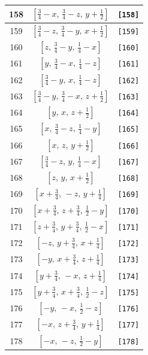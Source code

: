 \documentclass[fleqn,8pt]{jsarticle}
\begin{document}
\begin{longtable}{ccc}
158 & $\left[ \frac{3}{4} - x,\, \frac{3}{4} - z,\, y + \frac{1}{2} \right]$ & {\tt [158]} \\ \hline
159 & $\left[ \frac{3}{4} - z,\, \frac{3}{4} - y,\, x + \frac{1}{2} \right]$ & {\tt [159]} \\ \hline
160 & $\left[ z,\, \frac{3}{4} - y,\, \frac{1}{4} - x \right]$ & {\tt [160]} \\ \hline
161 & $\left[ y,\, \frac{3}{4} - x,\, \frac{1}{4} - z \right]$ & {\tt [161]} \\ \hline
162 & $\left[ \frac{3}{4} - y,\, x,\, \frac{1}{4} - z \right]$ & {\tt [162]} \\ \hline
163 & $\left[ \frac{3}{4} - y,\, \frac{3}{4} - x,\, z + \frac{1}{2} \right]$ & {\tt [163]} \\ \hline
164 & $\left[ y,\, x,\, z + \frac{1}{2} \right]$ & {\tt [164]} \\ \hline
165 & $\left[ x,\, \frac{3}{4} - z,\, \frac{1}{4} - y \right]$ & {\tt [165]} \\ \hline
166 & $\left[ x,\, z,\, y + \frac{1}{2} \right]$ & {\tt [166]} \\ \hline
167 & $\left[ \frac{3}{4} - z,\, y,\, \frac{1}{4} - x \right]$ & {\tt [167]} \\ \hline
168 & $\left[ z,\, y,\, x + \frac{1}{2} \right]$ & {\tt [168]} \\ \hline
169 & $\left[ x + \frac{3}{4},\, - z,\, y + \frac{1}{4} \right]$ & {\tt [169]} \\ \hline
170 & $\left[ x + \frac{3}{4},\, z + \frac{3}{4},\, \frac{1}{2} - y \right]$ & {\tt [170]} \\ \hline
171 & $\left[ z + \frac{3}{4},\, y + \frac{3}{4},\, \frac{1}{2} - x \right]$ & {\tt [171]} \\ \hline
172 & $\left[ - z,\, y + \frac{3}{4},\, x + \frac{1}{4} \right]$ & {\tt [172]} \\ \hline
173 & $\left[ - y,\, x + \frac{3}{4},\, z + \frac{1}{4} \right]$ & {\tt [173]} \\ \hline
174 & $\left[ y + \frac{3}{4},\, - x,\, z + \frac{1}{4} \right]$ & {\tt [174]} \\ \hline
175 & $\left[ y + \frac{3}{4},\, x + \frac{3}{4},\, \frac{1}{2} - z \right]$ & {\tt [175]} \\ \hline
176 & $\left[ - y,\, - x,\, \frac{1}{2} - z \right]$ & {\tt [176]} \\ \hline
177 & $\left[ - x,\, z + \frac{3}{4},\, y + \frac{1}{4} \right]$ & {\tt [177]} \\ \hline
178 & $\left[ - x,\, - z,\, \frac{1}{2} - y \right]$ & {\tt [178]} \\ \hline

\end{longtable}
\end{document}
